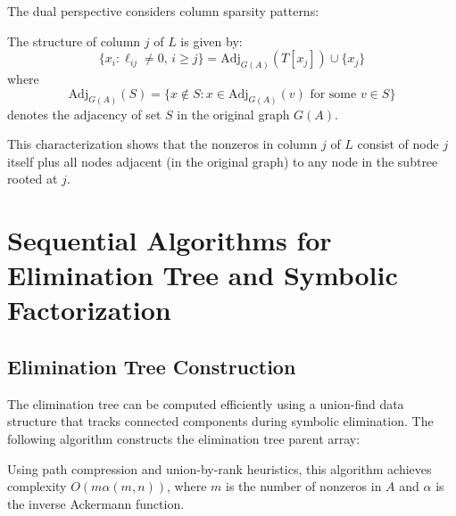 The dual perspective considers column sparsity patterns:

\begin{theorem}
The structure of column \(j\) of \(L\) is given by:
\[
\{x_i : \ell_{ij} \neq 0,\, i \geq j\} = \text{Adj}_{G(A)}(T[x_j]) \cup \{x_j\}
\]
where
\[
\text{Adj}_{G(A)}(S) = \{x \notin S : x \in \text{Adj}_{G(A)}(v) \text{ for some } v \in S\}
\]
denotes the adjacency of set \(S\) in the original graph \(G(A)\).
\end{theorem}

This characterization shows that the nonzeros in column \(j\) of \(L\) consist of node \(j\) itself plus all nodes adjacent (in the original graph) to any node in the subtree rooted at \(j\).

\section{Sequential Algorithms for Elimination Tree and Symbolic Factorization}

\subsection{Elimination Tree Construction}

The elimination tree can be computed efficiently using a union-find data structure that tracks connected components during symbolic elimination. The following algorithm constructs the elimination tree parent array:



Using path compression and union-by-rank heuristics, this algorithm achieves complexity $O(m\alpha(m,n))$, where $m$ is the number of nonzeros in $A$ and $\alpha$ is the inverse Ackermann function.

